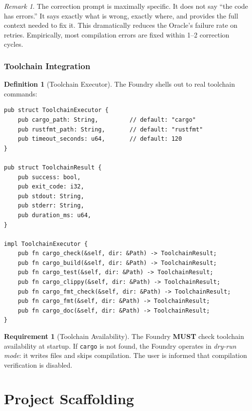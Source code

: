 \documentclass[11pt,a4paper,twoside]{article}
\theoremstyle{definition}
\newtheorem{definition}{Definition}[section]
\newtheorem{requirement}{Requirement}[section]
\theoremstyle{plain}
\theoremstyle{remark}
\newtheorem{remark}{Remark}[section]
\begin{document}
\begin{remark}
The correction prompt is maximally specific. It does not say ``the
code has errors.'' It says exactly what is wrong, exactly where, and
provides the full context needed to fix it. This dramatically reduces
the Oracle's failure rate on retries. Empirically, most compilation
errors are fixed within 1--2 correction cycles.
\end{remark}


\section{Toolchain Integration}\label{sec:toolchain}

\begin{definition}[Toolchain Executor]\label{def:toolchain}
The Foundry shells out to real toolchain commands:
\begin{lstlisting}
pub struct ToolchainExecutor {
    pub cargo_path: String,         // default: "cargo"
    pub rustfmt_path: String,       // default: "rustfmt"
    pub timeout_seconds: u64,       // default: 120
}

pub struct ToolchainResult {
    pub success: bool,
    pub exit_code: i32,
    pub stdout: String,
    pub stderr: String,
    pub duration_ms: u64,
}

impl ToolchainExecutor {
    pub fn cargo_check(&self, dir: &Path) -> ToolchainResult;
    pub fn cargo_build(&self, dir: &Path) -> ToolchainResult;
    pub fn cargo_test(&self, dir: &Path) -> ToolchainResult;
    pub fn cargo_clippy(&self, dir: &Path) -> ToolchainResult;
    pub fn cargo_fmt_check(&self, dir: &Path) -> ToolchainResult;
    pub fn cargo_fmt(&self, dir: &Path) -> ToolchainResult;
    pub fn cargo_doc(&self, dir: &Path) -> ToolchainResult;
}
\end{lstlisting}
\end{definition}

\begin{requirement}[Toolchain Availability]\label{req:toolchain}
The Foundry \textbf{MUST} check toolchain availability at startup.
If \texttt{cargo} is not found, the Foundry operates in
\emph{dry-run mode}: it writes files and skips compilation. The user
is informed that compilation verification is disabled.
\end{requirement}


\part{Project Scaffolding}\label{part:scaffold}
\end{document}
